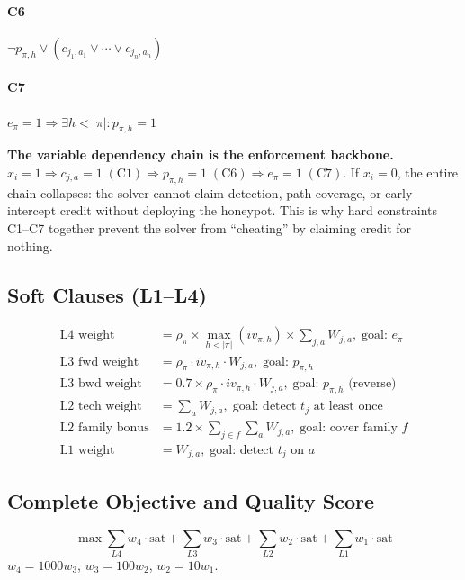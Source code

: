\documentclass[journal]{IEEEtran}
\begin{document}
\paragraph{C6} $\neg p_{\pi,h}\vee(c_{j_1,a_1}\vee\cdots\vee c_{j_n,a_n})$
\paragraph{C7} $e_\pi=1\Rightarrow\exists h<|\pi|:p_{\pi,h}=1$

\begin{insightbox}
\textbf{The variable dependency chain is the enforcement
backbone.}
$x_i=1\Rightarrow c_{j,a}=1\;(\text{C1})
\Rightarrow p_{\pi,h}=1\;(\text{C6})
\Rightarrow e_\pi=1\;(\text{C7})$.
If $x_i=0$, the entire chain collapses: the solver cannot
claim detection, path coverage, or early-intercept credit
without deploying the honeypot.
This is why hard constraints C1--C7 together prevent the
solver from ``cheating'' by claiming credit for nothing.
\end{insightbox}

\subsection{Soft Clauses (L1--L4)}

\begin{align}
\text{L4 weight} &= \rho_\pi\times\max_{h<|\pi|}(iv_{\pi,h})\times\sum_{j,a}W_{j,a},\;\text{goal: }e_\pi\\
\text{L3 fwd weight} &= \rho_\pi\cdot iv_{\pi,h}\cdot W_{j,a},\;\text{goal: }p_{\pi,h}\\
\text{L3 bwd weight} &= 0.7\times\rho_\pi\cdot iv_{\pi,h}\cdot W_{j,a},\;\text{goal: }p_{\pi,h}\text{ (reverse)}\\
\text{L2 tech weight} &= \sum_a W_{j,a},\;\text{goal: detect }t_j\text{ at least once}\\
\text{L2 family bonus} &= 1.2\times\sum_{j\in f}\sum_a W_{j,a},\;\text{goal: cover family }f\\
\text{L1 weight} &= W_{j,a},\;\text{goal: detect }t_j\text{ on }a
\end{align}

\subsection{Complete Objective and Quality Score}

\begin{equation}
\max\sum_{L4}w_4\cdot\text{sat}+\sum_{L3}w_3\cdot\text{sat}
   +\sum_{L2}w_2\cdot\text{sat}+\sum_{L1}w_1\cdot\text{sat}
\end{equation}
$w_4=1000w_3$, $w_3=100w_2$, $w_2=10w_1$.
\end{document}
